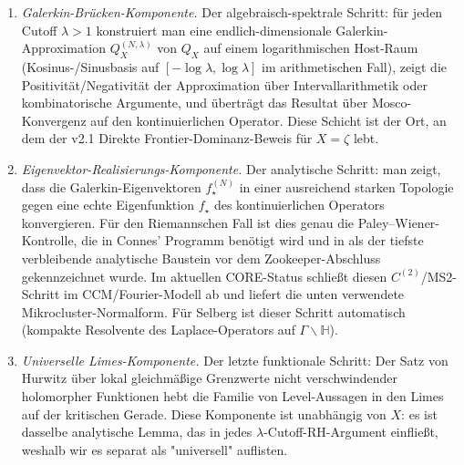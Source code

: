 \documentclass[11pt]{article}
\theoremstyle{definition}
\theoremstyle{remark}
\begin{document}
\begin{enumerate}
\item[\textbf{(GBC)}] \emph{Galerkin-Brücken-Komponente.} Der
algebraisch-spektrale Schritt: für jeden Cutoff $\lambda > 1$ konstruiert
man eine endlich-dimensionale Galerkin-Approximation $Q_X^{(N,\lambda)}$
von $Q_X$ auf einem logarithmischen Host-Raum (Kosinus-/Sinusbasis auf
$[-\log\lambda,\log\lambda]$ im arithmetischen Fall), zeigt die
Positivität/Negativität der Approximation über Intervallarithmetik
oder kombinatorische Argumente, und überträgt das Resultat über Mosco-Konvergenz
\cite{MetaGalerkinBridge,ConnesConsaniMoscovici2025} auf den kontinuierlichen Operator.
Diese Schicht ist der Ort, an dem der v2.1 Direkte Frontier-Dominanz-Beweis
\cite{Geiger2026RHII} für $X = \zeta$ lebt.

\item[$\boldsymbol{C^{(2)}}$] \emph{Eigenvektor-Realisierungs-Komponente.} Der analytische
Schritt: man zeigt, dass die Galerkin-Eigenvektoren $f_\star^{(N)}$ in einer
ausreichend starken Topologie gegen eine echte Eigenfunktion $f_\star$ des kontinuierlichen
Operators konvergieren. Für den Riemannschen Fall ist dies genau die Paley--Wiener-Kontrolle,
die in Connes' Programm benötigt wird
\cite{Connes2026,ConnesConsaniMoscovici2025} und in \cite{Geiger2026RHII}
als der tiefste verbleibende analytische Baustein vor dem Zookeeper-Abschluss gekennzeichnet
wurde. Im aktuellen CORE-Status schließt \cite{Zookeeper2026} diesen
$C^{(2)}$/MS2-Schritt im CCM/Fourier-Modell ab und liefert die unten
verwendete Mikrocluster-Normalform. Für Selberg ist dieser Schritt automatisch (kompakte Resolvente
des Laplace-Operators auf $\Gamma\backslash\mathbb{H}$).

\item[\textbf{(Hurwitz)}] \emph{Universelle Limes-Komponente.} Der
letzte funktionale Schritt: Der Satz von Hurwitz über lokal gleichmäßige Grenzwerte
nicht verschwindender holomorpher Funktionen hebt die Familie von
Level-Aussagen in den Limes auf der kritischen Gerade. Diese
Komponente ist unabhängig von $X$: es ist dasselbe analytische Lemma,
das in jedes $\lambda$-Cutoff-RH-Argument einfließt, weshalb wir es
separat als "universell" auflisten.
\end{enumerate}
\end{document}
